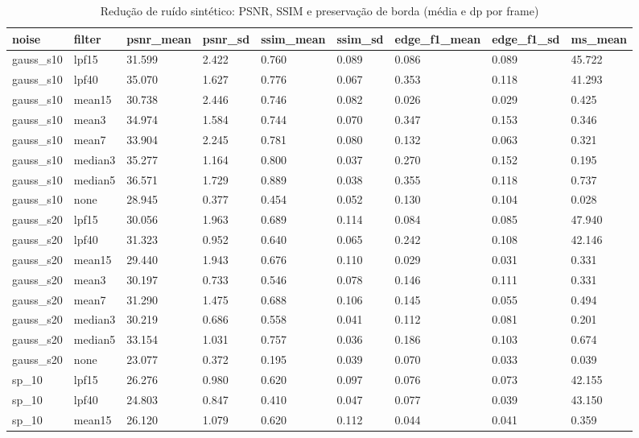 \begin{table}[ht]
\centering
\caption{Redução de ruído sintético: PSNR, SSIM e preservação de borda (média e dp por frame)}
\begin{tabular}{lllllllll}
\toprule
noise & filter & psnr\_mean & psnr\_sd & ssim\_mean & ssim\_sd & edge\_f1\_mean & edge\_f1\_sd & ms\_mean \\
\midrule
gauss\_s10 & lpf15 & 31.599 & 2.422 & 0.760 & 0.089 & 0.086 & 0.089 & 45.722 \\
gauss\_s10 & lpf40 & 35.070 & 1.627 & 0.776 & 0.067 & 0.353 & 0.118 & 41.293 \\
gauss\_s10 & mean15 & 30.738 & 2.446 & 0.746 & 0.082 & 0.026 & 0.029 & 0.425 \\
gauss\_s10 & mean3 & 34.974 & 1.584 & 0.744 & 0.070 & 0.347 & 0.153 & 0.346 \\
gauss\_s10 & mean7 & 33.904 & 2.245 & 0.781 & 0.080 & 0.132 & 0.063 & 0.321 \\
gauss\_s10 & median3 & 35.277 & 1.164 & 0.800 & 0.037 & 0.270 & 0.152 & 0.195 \\
gauss\_s10 & median5 & 36.571 & 1.729 & 0.889 & 0.038 & 0.355 & 0.118 & 0.737 \\
gauss\_s10 & none & 28.945 & 0.377 & 0.454 & 0.052 & 0.130 & 0.104 & 0.028 \\
gauss\_s20 & lpf15 & 30.056 & 1.963 & 0.689 & 0.114 & 0.084 & 0.085 & 47.940 \\
gauss\_s20 & lpf40 & 31.323 & 0.952 & 0.640 & 0.065 & 0.242 & 0.108 & 42.146 \\
gauss\_s20 & mean15 & 29.440 & 1.943 & 0.676 & 0.110 & 0.029 & 0.031 & 0.331 \\
gauss\_s20 & mean3 & 30.197 & 0.733 & 0.546 & 0.078 & 0.146 & 0.111 & 0.331 \\
gauss\_s20 & mean7 & 31.290 & 1.475 & 0.688 & 0.106 & 0.145 & 0.055 & 0.494 \\
gauss\_s20 & median3 & 30.219 & 0.686 & 0.558 & 0.041 & 0.112 & 0.081 & 0.201 \\
gauss\_s20 & median5 & 33.154 & 1.031 & 0.757 & 0.036 & 0.186 & 0.103 & 0.674 \\
gauss\_s20 & none & 23.077 & 0.372 & 0.195 & 0.039 & 0.070 & 0.033 & 0.039 \\
sp\_10 & lpf15 & 26.276 & 0.980 & 0.620 & 0.097 & 0.076 & 0.073 & 42.155 \\
sp\_10 & lpf40 & 24.803 & 0.847 & 0.410 & 0.047 & 0.077 & 0.039 & 43.150 \\
sp\_10 & mean15 & 26.120 & 1.079 & 0.620 & 0.112 & 0.044 & 0.041 & 0.359 \\

\end{tabular}
\end{table}

